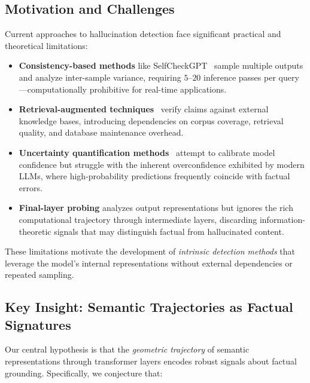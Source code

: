 \documentclass[11pt]{article}
\begin{document}
\subsection{Motivation and Challenges}

Current approaches to hallucination detection face significant practical and theoretical limitations:

\begin{itemize}[leftmargin=*]
    \item \textbf{Consistency-based methods} like SelfCheckGPT~\cite{manakul2023selfcheckgpt} sample multiple outputs and analyze inter-sample variance, requiring $5$--$20$ inference passes per query—computationally prohibitive for real-time applications.
    
    \item \textbf{Retrieval-augmented techniques}~\cite{peng2023check, min2023factscore} verify claims against external knowledge bases, introducing dependencies on corpus coverage, retrieval quality, and database maintenance overhead.
    
    \item \textbf{Uncertainty quantification methods}~\cite{kuhn2023semantic} attempt to calibrate model confidence but struggle with the inherent overconfidence exhibited by modern LLMs, where high-probability predictions frequently coincide with factual errors.
    
    \item \textbf{Final-layer probing} analyzes output representations but ignores the rich computational trajectory through intermediate layers, discarding information-theoretic signals that may distinguish factual from hallucinated content.
\end{itemize}

These limitations motivate the development of \emph{intrinsic detection methods} that leverage the model's internal representations without external dependencies or repeated sampling.

\subsection{Key Insight: Semantic Trajectories as Factual Signatures}

Our central hypothesis is that the \emph{geometric trajectory} of semantic representations through transformer layers encodes robust signals about factual grounding. Specifically, we conjecture that:
\end{document}
